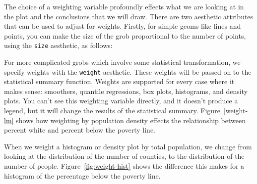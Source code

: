 \noindent The choice of a weighting variable profoundly effects what we are looking at in the plot and the conclusions that we will draw.  There are two aesthetic attributes that can be used to adjust for weights.  Firstly, for simple geoms like lines and points, you can make the size of the grob proportional to the number of points, using the {\tt size} aesthetic, as follows:

%


For more complicated grobs which involve some statistical transformation, we specify weights with the {\tt weight} aesthetic.  These weights will be passed on to the statistical summary function.  Weights are supported for every case where it makes sense: smoothers, quantile regressions, box plots, histograms, and density plots.  You can't see this weighting variable directly, and it doesn't produce a legend, but it will change the results of the statistical summary.  Figure~\ref{weight-lm} shows how weighting by population density effects the relationship between percent white and percent below the poverty line.

%


When we weight a histogram or density plot by total population, we change from looking at the distribution of the number of counties, to the distribution of the number of people.  Figure~\ref{fig:weight-hist} shows the difference this makes for a histogram of the percentage below the poverty line.

%



